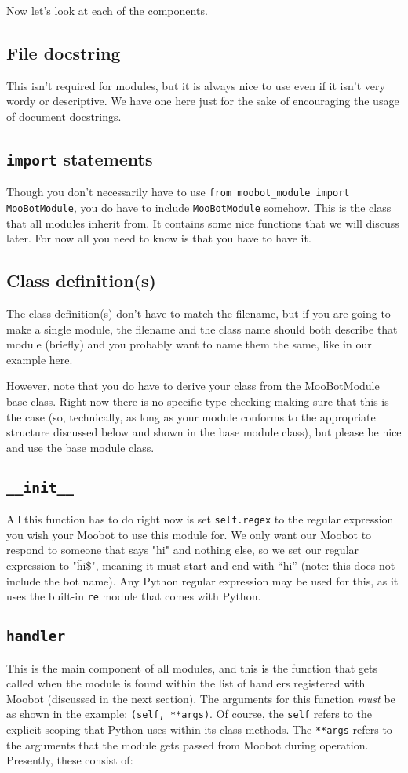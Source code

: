 \documentclass{article}[12pt]
\begin{document}
Now let's look at each of the components.
\subsection{File docstring}
This isn't required for modules, but it is always nice to use even if it isn't
very wordy or descriptive.  We have one here just for the sake of encouraging
the usage of document docstrings.

\subsection{\texttt{import} statements}
Though you don't necessarily have to use \texttt{from moobot\_module import
MooBotModule}, you do have to include \texttt{MooBotModule} somehow.  This is
the class that all modules inherit from.  It contains some nice functions that
we will discuss later.  For now all you need to know is that you have to have
it.

\subsection{Class definition(s)}
The class definition(s) don't have to match the filename, but if you are going
to make a single module, the filename and the class name should both describe
that module (briefly) and you probably want to name them the same, like in our
example here.

However, note that you do have to derive your class from the MooBotModule base
class.  Right now there is no specific type-checking making sure that this is
the case (so, technically, as long as your module conforms to the appropriate
structure discussed below and shown in the base module class), but please be
nice and use the base module class.

\subsection{\texttt{\_\_init\_\_}}
All this function has to do right now is set \texttt{self.regex} to the
regular expression you wish your Moobot to use this module for.  We only want
our Moobot to respond to someone that says "hi" and nothing else, so we set
our regular expression to "\^hi\$", meaning it must start and end with ``hi''
(note: this does not include the bot name).  Any Python regular expression may
be used for this, as it uses the built-in \texttt{re} module that comes with
Python.

\subsection{\texttt{handler}}
This is the main component of all modules, and this is the function that gets
called when the module is found within the list of handlers registered with
Moobot (discussed in the next section).  The arguments for this function
\emph{must} be as shown in the example: \texttt{(self, **args)}.  Of course,
the \texttt{self} refers to the explicit scoping that Python uses within its
class methods.  The \texttt{**args} refers to the arguments that the module
gets passed from Moobot during operation.  Presently, these consist of:
\end{document}
